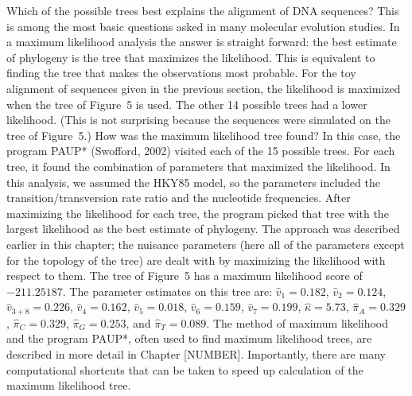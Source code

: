 \documentclass{svmult}
\begin{document}
Which of the possible trees best explains the alignment of DNA sequences? This is among the most basic questions asked in many molecular evolution studies. In a maximum likelihood analysis the answer is straight forward: the
best estimate of phylogeny is the tree that maximizes the likelihood. This is equivalent to finding the tree that makes the observations
most probable. For the toy alignment of sequences given in the previous section, the likelihood is maximized when the tree of
Figure~5 is used. The other 14 possible trees had a lower likelihood. (This is not surprising because the sequences were simulated on the tree of Figure~5.)
How was the maximum likelihood tree found? In this case, the program
PAUP* (Swofford, 2002) visited each of the 15 possible trees. For each tree, it found the combination of parameters that maximized the
likelihood. In this analysis, we assumed the HKY85 model, so the parameters included the transition/transversion
rate ratio and the nucleotide frequencies. After maximizing the likelihood for each tree, the program picked that tree with the largest likelihood as the best estimate of phylogeny. The approach was described earlier in this chapter; the nuisance parameters (here all of the parameters
except for the topology of the tree) are dealt with by maximizing the likelihood with respect to them. The tree of Figure~5 has a maximum
likelihood score of $-211.25187$. The parameter estimates on this tree are:
$\hat{v}_1 = 0.182$,
$\hat{v}_2 = 0.124$,
$\hat{v}_{3 + 8} = 0.226$,
$\hat{v}_4 = 0.162$,
$\hat{v}_5 = 0.018$,
$\hat{v}_6 = 0.159$,
$\hat{v}_7 = 0.199$,
$\hat{\kappa} = 5.73$,
$\hat{\pi}_A = 0.329$,
$\hat{\pi}_C = 0.329$,
$\hat{\pi}_G = 0.253$, and
$\hat{\pi}_T = 0.089$.
The method of maximum likelihood and the program PAUP*, often used to find maximum likelihood trees, are described in more
detail in Chapter [NUMBER]. Importantly, there are many computational shortcuts that can be taken to speed up calculation of the maximum likelihood
tree.
\end{document}
